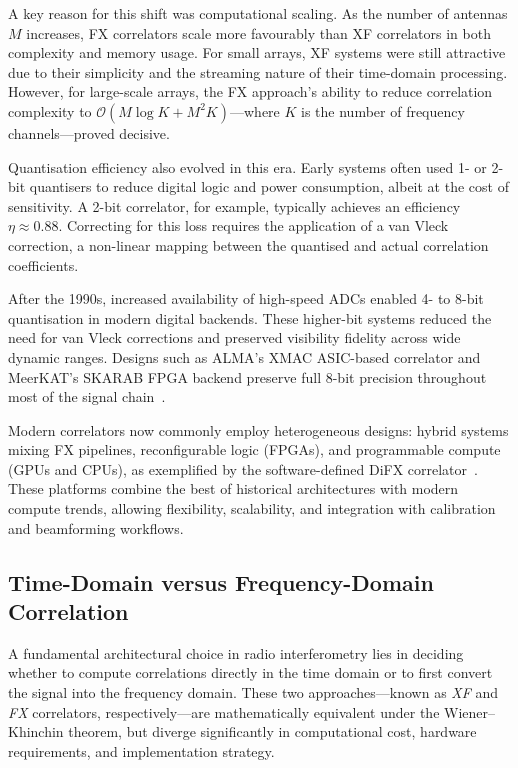     A key reason for this shift was computational scaling. As the number of antennas \( M \) increases, FX correlators scale more favourably than XF correlators in both complexity and memory usage. For small arrays, XF systems were still attractive due to their simplicity and the streaming nature of their time-domain processing. However, for large-scale arrays, the FX approach’s ability to reduce correlation complexity to \(\mathcal{O}(M\log K + M^2K)\)—where \( K \) is the number of frequency channels—proved decisive.

    Quantisation efficiency also evolved in this era. Early systems often used 1- or 2-bit quantisers to reduce digital logic and power consumption, albeit at the cost of sensitivity. A 2-bit correlator, for example, typically achieves an efficiency \( \eta \approx 0.88 \). Correcting for this loss requires the application of a van Vleck correction, a non-linear mapping between the quantised and actual correlation coefficients.

    After the 1990s, increased availability of high-speed ADCs enabled 4- to 8-bit quantisation in modern digital backends. These higher-bit systems reduced the need for van Vleck corrections and preserved visibility fidelity across wide dynamic ranges. Designs such as ALMA’s XMAC ASIC-based correlator and MeerKAT’s SKARAB FPGA backend preserve full 8-bit precision throughout most of the signal chain~\cite{Escoffier2007, Romein2021}.

    Modern correlators now commonly employ heterogeneous designs: hybrid systems mixing FX pipelines, reconfigurable logic (FPGAs), and programmable compute (GPUs and CPUs), as exemplified by the software-defined DiFX correlator~\cite{Deller2011}. These platforms combine the best of historical architectures with modern compute trends, allowing flexibility, scalability, and integration with calibration and beamforming workflows.

    \subsection{Time-Domain versus Frequency-Domain Correlation}
    A fundamental architectural choice in radio interferometry lies in deciding whether to compute correlations directly in the time domain or to first convert the signal into the frequency domain. These two approaches—known as \textit{XF} and \textit{FX} correlators, respectively—are mathematically equivalent under the Wiener–Khinchin theorem, but diverge significantly in computational cost, hardware requirements, and implementation strategy.

